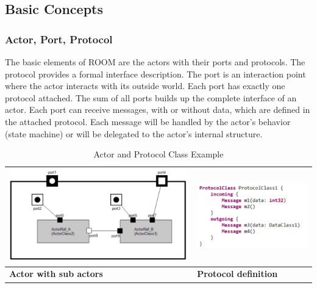 \subsection{Basic Concepts}
\label{sec:basic_concepts}

\subsubsection*{Actor, Port, Protocol}

The basic elements of ROOM are the actors with their ports and protocols.
The protocol provides a formal interface description. The port is an interaction
point where the actor interacts with its outside world. Each port has exactly one protocol
attached. The sum of all ports builds up the complete interface of an actor.
Each port can receive messages, with or without data, which are defined in the attached protocol.
Each message will be handled by the actor's behavior (state machine) or will be delegated to the actor's internal structure.

\begin{table}
\caption{Actor and Protocol Class Example}
\begin{tabular}{|l|l|}
\hline
\includegraphics[scale=0.85]{images/040-ActorClass.png} & \includegraphics[scale=0.85]{images/040-ProtocolClassTextualNotation.png} \\ \hline
\textbf{Actor with sub actors} & \textbf{Protocol definition} \\ \hline
\end{tabular}
\end{table}

